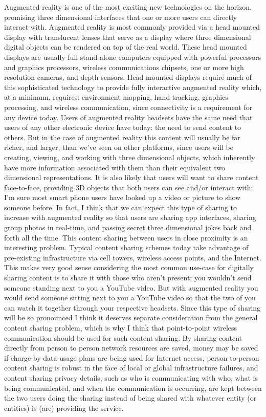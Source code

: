 \documentclass[12pt,dvips]{report}
\begin{document}
Augmented reality is one of the most exciting new technologies on the horizon, promising three dimensional interfaces that one or more users can directly interact with. Augmented reality is most commonly provided via a head mounted display with translucent lenses that serve as a display where three dimensional digital objects can be rendered on top of the real world. These head mounted displays are usually full stand-alone computers equipped with powerful processors and graphics processors, wireless communications chipsets, one or more high resolution cameras, and depth sensors. Head mounted displays require much of this sophisticated technology to provide fully interactive augmented reality which, at a minimum, requires: environment mapping, hand tracking, graphics processing, and wireless communication, since connectivity is a requirement for any device today. 
Users of augmented reality headsets have the same need that users of any other electronic device have today: the need to send content to others. But in the case of augmented reality this content will usually be far richer, and larger, than we've seen on other platforms, since users will be creating, viewing, and working with three dimensional objects, which inherently have more information associated with them than their equivalent two dimensional representations. It is also likely that users will want to share content face-to-face, providing 3D objects that both users can see and/or interact with; I'm sure most smart phone users have looked up a video or picture to show someone before. In fact, I think that we can expect this type of sharing to increase with augmented reality so that users are sharing app interfaces, sharing group photos in real-time, and passing secret three dimensional jokes back and forth all the time.
This content sharing between users in close proximity is an interesting problem. Typical content sharing schemes today take advantage of pre-existing infrastructure via cell towers, wireless access points, and the Internet. This makes very good sense considering the most common use-case for digitally sharing content is to share it with those who aren't present; you wouldn't send someone standing next to you a YouTube video. But with augmented reality you would send someone sitting next to you a YouTube video so that the two of you can watch it together through your respective headsets. Since this type of sharing will be so pronounced I think it deserves separate consideration from the general content sharing problem, which is why I think that point-to-point wireless communication should be used for such content sharing. By sharing content directly from person to person network resources are saved, money may be saved if charge-by-data-usage plans are being used for Internet access, person-to-person content sharing is robust in the face of local or global infrastructure failures, and content sharing privacy details, such as who is communicating with who, what is being communicated, and when the communication is occurring, are kept between the two users doing the sharing instead of being shared with whatever entity (or entities) is (are) providing the service. 
\end{document}
